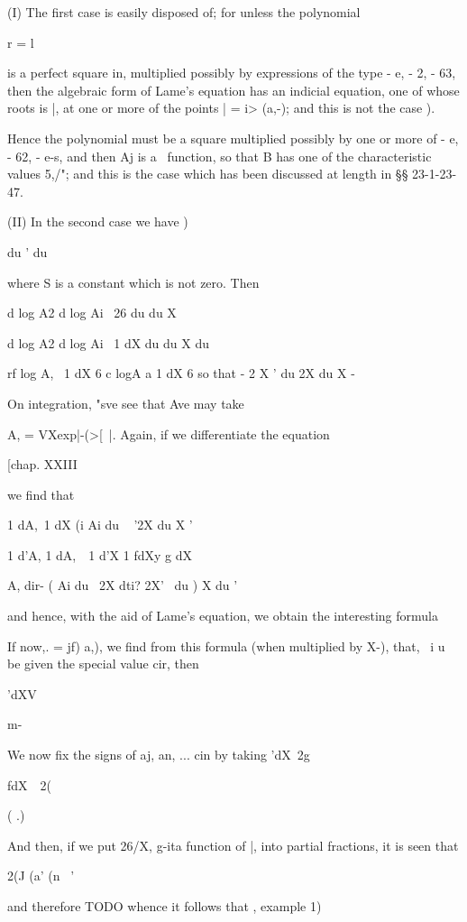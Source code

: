 {{{{{{{{(I) The first case is easily disposed of; for unless the polynomial

r = l

is a perfect square in, multiplied possibly by expressions of the
type - e, - 2, - 63, then the algebraic form of Lame's equation has
an indicial equation, one of whose roots is |, at one or more of the
points | = i> (a,-); and this is not the case ).

Hence the polynomial must be a square multiplied possibly by one or
more of - e, - 62, - e-s, and then Aj is a \Lame\ function, so that B
has one of the characteristic values 5,/"; and this is the case which
has been discussed at length in §§ 23-1-23-47.

(II) In the second case we have )

du ' du

where S is a constant which is not zero. Then

d log A2 d log Ai \ 26 du du X

d log A2 d log Ai \ 1 dX du du X du

rf log A, \ 1 dX 6 c logA a 1 dX 6 so that - 2 X ' du 2X du X -

%
%

On integration, "sve see that Ave may take

A, = VXexp|-(>[~|. Again, if we differentiate the equation

[chap. XXIII

we find that

1 dA,\ 1 dX (i Ai du ~ '2X du X '

1 d'A, 1 dA,\ \ 1 d'X 1 fdXy g dX

A, dir- ( Ai du \ 2X dti? 2X' \ du ) X du '

and hence, with the aid of Lame's equation, we obtain the interesting
formula

If now,. = jf) a,), we find from this formula (when multiplied by
X-), that, \ i u be given the special value cir, then

'dXV

m-

We now fix the signs of aj, an, ... cin by taking 'dX\ 2g

fdX\ \ 2(

( .)

And then, if we put 26/X, g-ita function of |, into partial fractions,
it is seen that

2(J (a' (n \ '

and therefore
TODO
whence it
follows that , example 1)

}}}}}}}}

